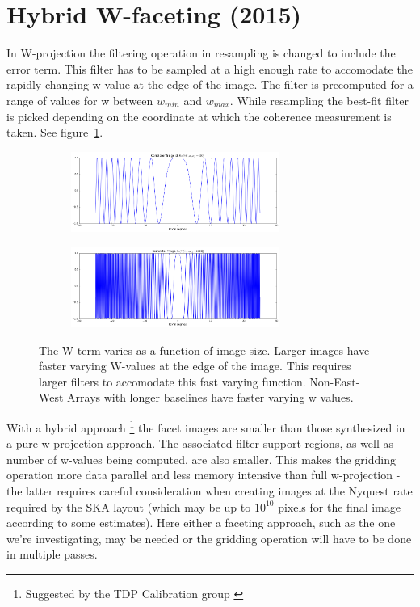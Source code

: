 \documentclass[a4paper,10pt]{article}
\begin{document}
\section{Hybrid W-faceting (2015)}
In W-projection \cite{cornwell2008noncoplanar} the filtering operation in resampling is changed to include the error term. This filter has to be sampled
at a high enough rate to accomodate the rapidly changing w value at the edge of the image. The filter is precomputed for a
range of values for w between $w_{min}$ and $w_{max}$. While resampling the best-fit filter is picked depending on the
coordinate at which the coherence measurement is taken. See figure~\ref{FIG_W}.
\begin{figure}[h!]
 \centering
 \begin{subfigure}[b]{0.75\textwidth}
    \centering
    \includegraphics[width=0.75\textwidth]{images/w100.png}
 \end{subfigure}
 \begin{subfigure}[b]{0.75\textwidth}
    \centering
    \includegraphics[width=0.75\textwidth]{images/w1000.png}
 \end{subfigure}
 \caption[W as a function of image size]{The W-term varies as a function of image size. Larger images have faster varying
 W-values at the edge of the image. This requires larger filters to accomodate this fast varying function. Non-East-West 
 Arrays with longer baselines have faster varying w values.}
 \label{FIG_W}
\end{figure}

With a hybrid approach \footnote{Suggested by the TDP Calibration group \cite{yashar2009tdp}} the facet images are smaller than those synthesized in a pure 
w-projection approach. The associated filter support regions, as well as number of w-values being computed, are also smaller. This 
makes the gridding operation more data parallel and less memory intensive than full w-projection - the latter requires careful consideration when creating 
images at the Nyquest rate required by the SKA layout (which may be up to $10^{10}$ pixels for the final image according to some estimates). 
Here either a faceting approach, such as the one we're investigating, may be needed or the gridding operation will have to be done in 
multiple passes.
\end{document}

